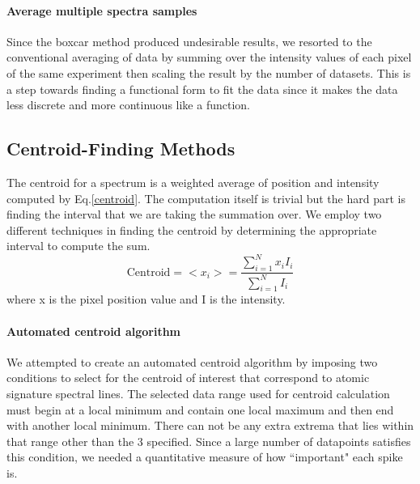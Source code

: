 \documentclass[authoryear, 12pt,5p, times]{elsarticle}
\begin{document}
 \paragraph*{\textbf{Average multiple spectra samples}}
Since the boxcar method produced undesirable results, we resorted to the conventional averaging of data by summing over the intensity values of each pixel of the same experiment then scaling the result by the number of datasets. This is a step towards finding a functional form to fit the data since it makes the data less discrete and more continuous like a function. 
	\subsection{Centroid-Finding Methods}
	The centroid for a spectrum is a weighted average of position and intensity computed by Eq.\ref{centroid}. The computation itself is trivial but the hard part is finding the interval that we are taking the summation over. We employ two different techniques in finding the centroid by determining the appropriate interval to compute the sum.
	\begin{equation}
	\textrm{Centroid} =<x_i>=\frac{\sum\limits^N_{i=1}x_i I_i}{\sum\limits^N_{i=1}I_i}
	\label{centroid}
	\end{equation}
	where x is the pixel position value and I is the intensity.
	\paragraph*{\textbf{Automated centroid algorithm}}
 We attempted to create an automated centroid algorithm by imposing two conditions to select for the centroid of interest that correspond to atomic signature spectral lines. The selected data range used for centroid calculation must begin at a local minimum and contain one local maximum and then end with another local minimum. There can not be any extra extrema that lies within that range other than the 3 specified. Since a large number of datapoints satisfies this condition, we needed a quantitative measure of how ``important" each spike is.  
 
\end{document}
